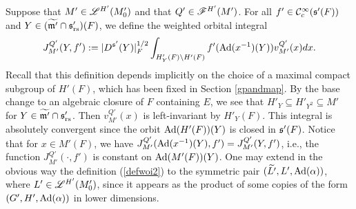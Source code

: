 \documentclass[a4paper]{amsart}
\newcommand{\fm}{{\mathfrak{m}}} \newcommand{\fn}{{\mathfrak{n}}}\newcommand{\fo}{{\mathfrak{o}}} \newcommand{\fp}{{\mathfrak{p}}}
\newcommand{\wt}{\widetilde}                        \newcommand{\wh}{\widehat}                      \newcommand{\wpair}[1]{\left\{{#1}\right\}}
\theoremstyle{definition}
\theoremstyle{remark}
\numberwithin{equation}{subsection}
\begin{document}
Suppose that $M'\in\mathscr{L}^{H'}(M'_0)$ and that $Q'\in\mathscr{F}^{H'}(M')$. For all $f'\in {\mathcal {C}}_c^\infty({\mathfrak{s}}'(F))$ and $Y\in(\wt{\fm'}\cap\fs'_\rs)(F)$, we define the weighted orbital integral
\begin{equation}\label{defwoi2}
 J_{M'}^{Q'}(Y, f'):=|D^{{\mathfrak{s}}'}(Y)|_F^{1/2} \int_{H'_Y(F)\backslash H'(F)} f'({\mathrm{Ad}}(x^{-1})(Y)) v_{M'}^{Q'}(x) dx. 
\end{equation}
Recall that this definition depends implicitly on the choice of a maximal compact subgroup of $H'(F)$, which has been fixed in Section \ref{gpandmap}. By the base change to an algebraic closure of $F$ containing $E$, we see that $H'_Y\subseteq H'_{Y^2}\subseteq M'$ for $Y\in\wt{\fm'}\cap\fs'_\rs$. Then $v_{M'}^{Q'}(x)$ is left-invariant by $H'_Y(F)$. This integral is absolutely convergent since the orbit ${\mathrm{Ad}}(H'(F))(Y)$ is closed in ${\mathfrak{s}}'(F)$. 
Notice that for $x\in M'(F)$, we have $J_{M'}^{Q'}({\mathrm{Ad}}(x^{-1})(Y), f')=J_{M'}^{Q'}(Y, f')$, i.e., the function $J_{M'}^{Q'}(\cdot, f')$ is constant on ${\mathrm{Ad}}(M'(F))(Y)$. 
One may extend in the obvious way the definition (\ref{defwoi2}) to the symmetric pair $(\wt{L'}, L', \Ad(\alpha))$, where $L'\in\mathscr{L}^{H'}(M'_0)$, since it appears as the product of some copies of the form $(G', H', {\mathrm{Ad}}(\alpha))$ in lower dimensions. 
\end{document}
